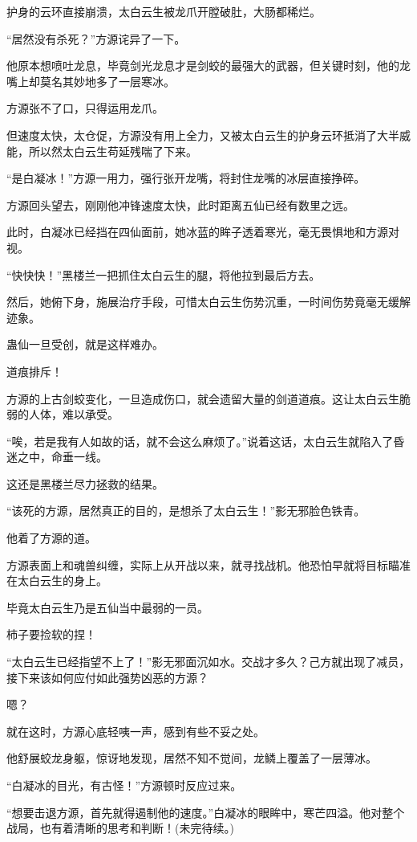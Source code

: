 \begin{this_body}
护身的云环直接崩溃，太白云生被龙爪开膛破肚，大肠都稀烂。

“居然没有杀死？”方源诧异了一下。

他原本想喷吐龙息，毕竟剑光龙息才是剑蛟的最强大的武器，但关键时刻，他的龙嘴上却莫名其妙地多了一层寒冰。

方源张不了口，只得运用龙爪。

但速度太快，太仓促，方源没有用上全力，又被太白云生的护身云环抵消了大半威能，所以然太白云生苟延残喘了下来。

“是白凝冰！”方源一用力，强行张开龙嘴，将封住龙嘴的冰层直接挣碎。

方源回头望去，刚刚他冲锋速度太快，此时距离五仙已经有数里之远。

此时，白凝冰已经挡在四仙面前，她冰蓝的眸子透着寒光，毫无畏惧地和方源对视。

“快快快！”黑楼兰一把抓住太白云生的腿，将他拉到最后方去。

然后，她俯下身，施展治疗手段，可惜太白云生伤势沉重，一时间伤势竟毫无缓解迹象。

蛊仙一旦受创，就是这样难办。

道痕排斥！

方源的上古剑蛟变化，一旦造成伤口，就会遗留大量的剑道道痕。这让太白云生脆弱的人体，难以承受。

“唉，若是我有人如故的话，就不会这么麻烦了。”说着这话，太白云生就陷入了昏迷之中，命垂一线。

这还是黑楼兰尽力拯救的结果。

“该死的方源，居然真正的目的，是想杀了太白云生！”影无邪脸色铁青。

他着了方源的道。

方源表面上和魂兽纠缠，实际上从开战以来，就寻找战机。他恐怕早就将目标瞄准在太白云生的身上。

毕竟太白云生乃是五仙当中最弱的一员。

柿子要捡软的捏！

“太白云生已经指望不上了！”影无邪面沉如水。交战才多久？己方就出现了减员，接下来该如何应付如此强势凶恶的方源？

嗯？

就在这时，方源心底轻咦一声，感到有些不妥之处。

他舒展蛟龙身躯，惊讶地发现，居然不知不觉间，龙鳞上覆盖了一层薄冰。

“白凝冰的目光，有古怪！”方源顿时反应过来。

“想要击退方源，首先就得遏制他的速度。”白凝冰的眼眸中，寒芒四溢。他对整个战局，也有着清晰的思考和判断！(未完待续。)

\end{this_body}

